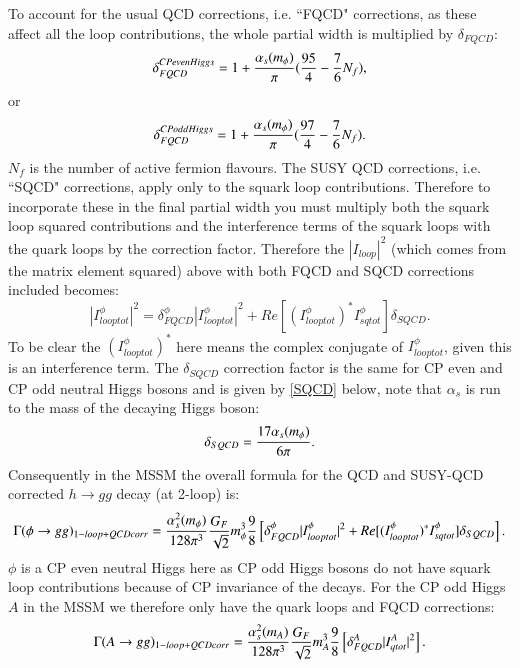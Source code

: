 \documentclass[final,3p,times]{elsarticle}
\begin{document}
To account for the usual QCD corrections, i.e. ``FQCD" corrections, as these affect all the loop contributions, the whole partial width is multiplied by $\delta_{FQCD}$:
\begin{equation}
\delta_{FQCD}^{CP even Higgs} = 1 + {\alpha_s(m_\phi) \over \pi}({95 \over 4}-{7 \over 6}N_{f}),
\end{equation}
or
\begin{equation}
\delta_{FQCD}^{CP odd Higgs} = 1 + {\alpha_s(m_\phi) \over \pi}({97 \over 4}-{7 \over 6}N_{f}).
\end{equation}
$N_{f}$ is the number of active fermion flavours.
The SUSY QCD corrections, i.e. ``SQCD" corrections, apply only to the squark loop contributions. Therefore to incorporate these in the final partial width you must multiply both the squark loop squared contributions and the interference terms of the squark loops with the quark loops by the correction factor. Therefore the $|I_{loop}|^2$ (which comes from the matrix element squared) above with both FQCD and SQCD corrections included becomes:
\begin{equation}
|I_{looptot}^\phi|^2 = \delta_{FQCD}^\phi|I_{looptot}^\phi|^2 + Re[({I_{looptot}^\phi})^* I_{sqtot}^\phi]\delta_{SQCD}.
\end{equation}
To be clear the $({I_{looptot}^\phi})^*$ here means the complex conjugate of ${I_{looptot}^\phi}$, given this is an interference term.
The $\delta_{SQCD}$ correction factor is the same for CP even and CP odd neutral Higgs bosons and is given by \eqref{SQCD} below, note that $\alpha_s$ is run to the mass of the decaying Higgs boson:
\begin{equation} \label{SQCD}
\delta_{SQCD} = {17 \alpha_s(m_\phi) \over 6 \pi}.
\end{equation}
Consequently in the MSSM the overall formula for the QCD and SUSY-QCD corrected $h \rightarrow gg$ decay (at 2-loop) is:
\begin{equation} \label{phiggQCDcorr}
\Gamma(\phi \rightarrow gg)_{1-loop + QCDcorr} = {\alpha_{s}^2 (m_\phi) \over 128 \pi^3}{G_{F} \over \sqrt{2}} m_{\phi}^3{9 \over 8}\left[\delta_{FQCD}^\phi|I_{looptot}^\phi|^2 + Re[({I_{looptot}^\phi})^* I_{sqtot}^\phi]\delta_{SQCD}\right].
\end{equation}
$\phi$ is a CP even neutral Higgs here as CP odd Higgs bosons do not have squark loop contributions because of CP invariance of the decays.
For the CP odd Higgs $A$ in the MSSM we therefore only have the quark loops and FQCD corrections:
\begin{equation} \label{AggQCDcorr}
\Gamma(A \rightarrow gg)_{1-loop + QCDcorr} = {\alpha_{s}^2 (m_A) \over 128 \pi^3}{G_{F} \over \sqrt{2}} m_{A}^3{9 \over 8}\left[\delta_{FQCD}^A|I_{qtot}^A|^2\right].
\end{equation}
\end{document}

